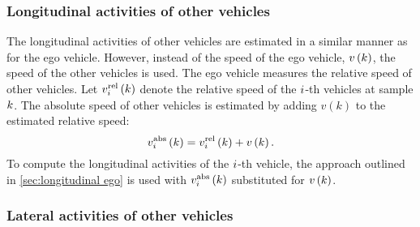 



\subsubsection{Longitudinal activities of other vehicles}
\label{sec:longitudinal other vehicles}

The longitudinal activities of other vehicles are estimated in a similar manner as for the ego vehicle. However, instead of the speed of the ego vehicle, $v\left(k\right)$, the speed of the other vehicles is used. The ego vehicle measures the relative speed of other vehicles. Let $v_{i}^{\mathrm{rel}}\left(k\right)$ denote the relative speed of the $i$-th vehicles at sample $k$. The absolute speed of other vehicles is estimated by adding $v(k)$ to the estimated relative speed:
\begin{equation}
	v_{i}^{\mathrm{abs}}\left(k\right) = v_{i}^{\mathrm{rel}}\left(k\right) + v\left(k\right).
\end{equation}
To compute the longitudinal activities of the $i$-th vehicle, the approach outlined in \cref{sec:longitudinal ego} is used with $v_{i}^{\mathrm{abs}}\left(k\right)$ substituted for $v\left(k\right)$. 



\subsubsection{Lateral activities of other vehicles}
\label{sec:lateral other vehicles}


